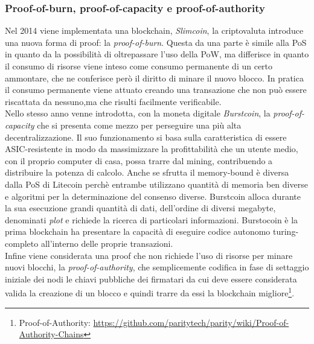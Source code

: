 	\subsubsection{Proof-of-burn, proof-of-capacity e proof-of-authority }
		
	
	Nel 2014 viene implementata una blockchain, \textit{Slimcoin}, la criptovaluta introduce una nuova forma di proof: la \textit{proof-of-burn}.
	Questa da una parte è simile alla PoS in quanto da la possibilità di oltrepassare l'uso della PoW, ma differisce in quanto il consumo di risorse viene inteso come consumo permanente di un certo ammontare, che ne conferisce però il diritto di minare il nuovo blocco\cite{slimecoinWhitepaper}.
	In pratica il consumo permanente viene attuato creando una transazione che non può essere riscattata da nessuno,ma che risulti facilmente verificabile.\\
	
	Nello stesso anno venne introdotta, con la moneta digitale \textit{Burstcoin}, la \textit{proof-of-capacity} che si presenta come mezzo per perseguire una più alta decentralizzazione. Il suo funzionamento si basa sulla caratteristica di essere ASIC-resistente in modo da massimizzare la profittabilità che un utente medio, con il proprio computer di casa, possa trarre dal mining, contribuendo a distribuire la potenza di calcolo. Anche se sfrutta il memory-bound è diversa dalla PoS di Litecoin perchè entrambe utilizzano quantità di memoria ben diverse e algoritmi per la determinazione del consenso diverse. Burstcoin alloca durante la sua esecuzione grandi quantità di dati, dell'ordine di diversi megabyte, denominati \textit{plot} e richiede la ricerca di particolari informazioni. Burstocoin è la prima blockchain ha presentare la capacità di eseguire codice autonomo turing-completo all'interno delle proprie transazioni.\\
	
	Infine viene considerata una proof che non richiede l'uso di risorse per minare nuovi blocchi, la \textit{proof-of-authority}, che semplicemente codifica in fase di settaggio iniziale dei nodi le chiavi pubbliche dei firmatari da cui deve essere considerata valida la creazione di un blocco e quindi trarre da essi la blockchain migliore\footnote{Proof-of-Authority: \url{https://github.com/paritytech/parity/wiki/Proof-of-Authority-Chains}}.
	
